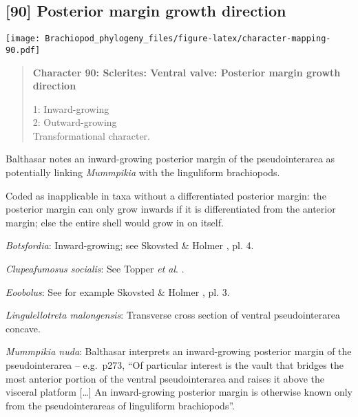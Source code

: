 \documentclass[openany]{book}
\theoremstyle{definition}
\theoremstyle{definition}
\theoremstyle{definition}
\theoremstyle{remark}
\begin{document}
\subsection*{{[}90{]} Posterior margin growth
direction}\label{posterior-margin-growth-direction}

\texttt{[image: Brachiopod\_phylogeny\_files/figure-latex/character-mapping-90.pdf]}

\begin{quote}
\textbf{Character 90: Sclerites: Ventral valve: Posterior margin growth
direction}

1: Inward-growing\\
2: Outward-growing\\
Transformational character.
\end{quote}

Balthasar \citeyearpar{Balthasar2008iMummpikia} notes an inward-growing
posterior margin of the pseudointerarea as potentially linking
\emph{Mummpikia} with the linguliform brachiopods.

Coded as inapplicable in taxa without a differentiated posterior margin:
the posterior margin can only grow inwards if it is differentiated from
the anterior margin; else the entire shell would grow in on itself.

\hypertarget{Botsfordia-coding-90}{}
\emph{Botsfordia}: Inward-growing; see Skovsted \& Holmer
\citeyearpar{Skovsted2005EarlyCambrian}, pl. 4.

\hypertarget{Clupeafumosus_socialis-coding-90}{}
\emph{Clupeafumosus socialis}: See Topper \emph{et al}.
\citeyearpar{Topper2013Reappraisalof}.

\hypertarget{Eoobolus-coding-90}{}
\emph{Eoobolus}: See for example Skovsted \& Holmer
\citeyearpar{Skovsted2005EarlyCambrian}, pl. 3.

\hypertarget{Lingulellotreta_malongensis-coding-90}{}
\emph{Lingulellotreta malongensis}: Transverse cross section of ventral
pseudointerarea concave.

\hypertarget{Mummpikia_nuda-coding-90}{}
\emph{Mummpikia nuda}: Balthasar \citeyearpar{Balthasar2008iMummpikia}
interprets an inward-growing posterior margin of the pseudointerarea --
e.g.~p273, ``Of particular interest is the vault that bridges the most
anterior portion of the ventral pseudointerarea and raises it above the
visceral platform {[}\ldots{}{]} An inward-growing posterior margin is
otherwise known only from the pseudointerareas of linguliform
brachiopods''.
\end{document}
